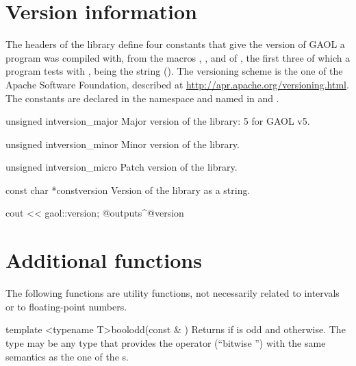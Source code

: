 \section{Version information}\label{sec:version}
%

The headers of the library define four constants that give the version of
GAOL a program was compiled with, from the macros , ,  and  of , the first three of which a program tests with ,
 being the string 
(). The
versioning scheme is the one of the Apache Software Foundation, described at
\url{http://apr.apache.org/versioning.html}. The constants are declared in the namespace  and named in
 and .\newinvfive

\begin{defconst}{unsigned int}{version\_major}
  Major version of the library: 5 for GAOL v5.
\end{defconst}

\begin{defconst}{unsigned int}{version\_minor}
  Minor version of the library.
\end{defconst}

\begin{defconst}{unsigned int}{version\_micro}
  Patch version of the library.
\end{defconst}

\begin{defconst}{const char *const}{version}
  Version of the library as a string.
\begin{example}
cout << gaol::version;
@outputs^@version~
\end{example}
\end{defconst}

\section{Additional functions}\label{sec:additional-functions}

The following functions are utility functions, not necessarily related to
intervals or to floating-point numbers.

\begin{defTfun}{template <typename T>}{bool}{odd}{(const \& )}
  Returns  if  is odd and  otherwise. The type
   may be any type that provides the operator \code{\&} (``bitwise
  '') with the same semantics as the one of the s.
\end{defTfun}

